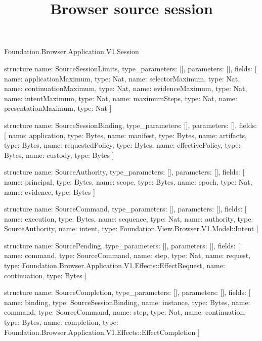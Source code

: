 \begin{lexlean}{Foundation.Browser.Application.V1.Session}
\title{Browser source session}
\begin{semanticmodule}
structure{
  name: SourceSessionLimits,
  type_parameters: [],
  parameters: [],
  fields: [
    {name: applicationMaximum, type: Nat},
    {name: selectorMaximum, type: Nat},
    {name: continuationMaximum, type: Nat},
    {name: evidenceMaximum, type: Nat},
    {name: intentMaximum, type: Nat},
    {name: maximumSteps, type: Nat},
    {name: presentationMaximum, type: Nat}
  ]
}

structure{
  name: SourceSessionBinding,
  type_parameters: [],
  parameters: [],
  fields: [
    {name: application, type: Bytes},
    {name: manifest, type: Bytes},
    {name: artifacts, type: Bytes},
    {name: requestedPolicy, type: Bytes},
    {name: effectivePolicy, type: Bytes},
    {name: custody, type: Bytes}
  ]
}

structure{
  name: SourceAuthority,
  type_parameters: [],
  parameters: [],
  fields: [
    {name: principal, type: Bytes},
    {name: scope, type: Bytes},
    {name: epoch, type: Nat},
    {name: evidence, type: Bytes}
  ]
}

structure{
  name: SourceCommand,
  type_parameters: [],
  parameters: [],
  fields: [
    {name: execution, type: Bytes},
    {name: sequence, type: Nat},
    {name: authority, type: SourceAuthority},
    {name: intent, type: Foundation.View.Browser.V1.Model::Intent}
  ]
}

structure{
  name: SourcePending,
  type_parameters: [],
  parameters: [],
  fields: [
    {name: command, type: SourceCommand},
    {name: step, type: Nat},
    {name: request, type: Foundation.Browser.Application.V1.Effects::EffectRequest},
    {name: continuation, type: Bytes}
  ]
}

structure{
  name: SourceCompletion,
  type_parameters: [],
  parameters: [],
  fields: [
    {name: binding, type: SourceSessionBinding},
    {name: instance, type: Bytes},
    {name: command, type: SourceCommand},
    {name: step, type: Nat},
    {name: continuation, type: Bytes},
    {name: completion, type: Foundation.Browser.Application.V1.Effects::EffectCompletion}
  ]
}


\end{semanticmodule}
\end{lexlean}
